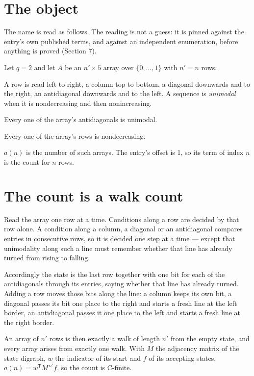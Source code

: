 \documentclass[11pt]{article}
\theoremstyle{definition}
\begin{document}
\section{The object}

The name is read as follows. The reading is not a guess: it is pinned against the entry's own published terms, and against an independent enumeration, before anything is proved (Section 7).

Let $q = 2$ and let $A$ be an $n' \times 5$ array over $\{0,\dots,1\}$ with $n' = n$ rows.

A row is read left to right, a column top to bottom, a diagonal downwards and to the right, an antidiagonal downwards and to the left. A sequence is {\itshape unimodal} when it is nondecreasing and then nonincreasing.

Every one of the array's antidiagonals is unimodal.

Every one of the array's rows is nondecreasing.

$a(n)$ is the number of such arrays. The entry's offset is 1, so its term of index $n$ is the count for $n$ rows.

\section{The count is a walk count}

Read the array one row at a time. Conditions along a row are decided by that row alone. A condition along a column, a diagonal or an antidiagonal compares entries in consecutive rows, so it is decided one step at a time --- except that unimodality along such a line must remember whether that line has already turned from rising to falling.

Accordingly the state is the last row together with one bit for each of the antidiagonals through its entries, saying whether that line has already turned. Adding a row moves those bits along the line: a column keeps its own bit, a diagonal passes its bit one place to the right and starts a fresh line at the left border, an antidiagonal passes it one place to the left and starts a fresh line at the right border.

An array of $n'$ rows is then exactly a walk of length $n'$ from the empty state, and every array arises from exactly one walk. With $M$ the adjacency matrix of the state digraph, $w$ the indicator of its start and $f$ of its accepting states, $a(n) = w^{\mathsf T}M^{\,n'}f$, so the count is C-finite.
\end{document}
